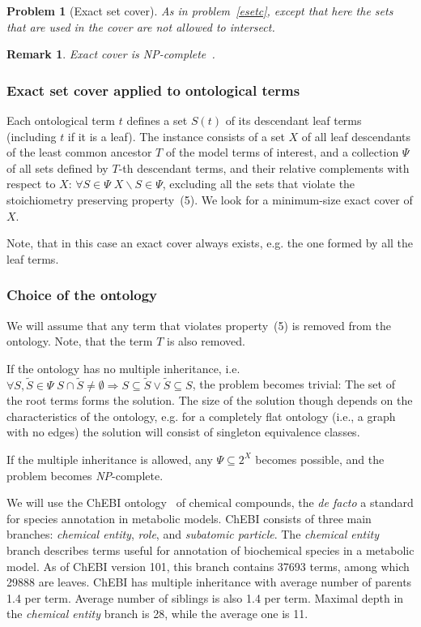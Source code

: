 \documentclass[10pt]{bmc_article}
\newenvironment{bmcformat}{\baselineskip20pt\sloppy\setboolean{publ}{false}}{\baselineskip20pt\sloppy}
\begin{document}
\begin{bmcformat}
\newtheorem{esetc}[pbm]{Problem}
\begin{esetc}[Exact set cover]
As in problem~\ref{esetc}, except that here the sets that are used in the cover are not allowed to intersect. 
\end{esetc}
\newtheorem{rem1}[rm]{Remark}
\begin{rem1}
Exact cover is \textit{NP}-complete~\cite{Goldreich2008}.
\end{rem1}

\subsubsection*{Exact set cover applied to ontological terms}
Each ontological term $t$ defines a set $S(t)$ of its descendant leaf terms (including $t$ if it is a leaf). The instance consists of a set $X$ of all leaf descendants of the least common ancestor $T$ of the model terms of interest, and a collection $\Psi$ of all sets defined by $T$-th descendant terms, and their relative complements with respect to $X$: $\forall S \in \Psi \; X\backslash S \in \Psi$, excluding all the sets that violate the stoichiometry preserving property~(5). We look for a minimum-size exact cover of $X$. 

Note, that in this case an exact cover always exists, e.g. the one formed by all the leaf terms.

\subsubsection*{Choice of the ontology}
We will assume that any term that violates property~(5) is removed from the ontology. Note, that the term $T$ is also removed.

If the ontology has no multiple inheritance, i.e. $\forall S, \tilde{S} \in \Psi \; S \cap \tilde{S} \neq \emptyset \Rightarrow S \subseteq \tilde{S} \lor \tilde{S} \subseteq S$, the problem becomes trivial: The set of the root terms forms the solution. The size of the solution though depends on the characteristics of the ontology, e.g. for a completely flat ontology (i.e., a graph with no edges) the solution will consist of singleton equivalence classes.

If the multiple inheritance is allowed, any $\Psi \subseteq 2^X$ becomes possible, and the problem becomes \textit{NP}-complete. 

We will use the ChEBI ontology~\cite{deMatos10} of chemical compounds, the \textit{de facto} a standard for species annotation in metabolic models. ChEBI consists of three main branches: \textit{chemical entity}, \textit{role}, and \textit{subatomic particle}. The \textit{chemical entity} branch describes terms useful for annotation of biochemical species in a metabolic model. As of ChEBI version 101, this branch contains 37693 terms, among which 29888 are leaves. ChEBI has multiple inheritance with average number of parents 1.4 per term. Average number of siblings is also 1.4 per term. Maximal depth in the \textit{chemical entity} branch is 28, while the average one is 11.


\end{bmcformat}
\end{document}
